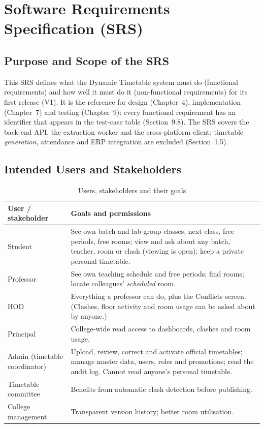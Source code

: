 \section{Software Requirements Specification (SRS)}

\subsection{Purpose and Scope of the SRS}
This SRS defines what the Dynamic Timetable system must do (functional requirements) and how well
it must do it (non-functional requirements) for its first release (V1). It is the reference for
design (Chapter~4), implementation (Chapter~7) and testing (Chapter~9): every functional requirement
has an identifier that appears in the test-case table (Section~9.8). The SRS covers the back-end
API, the extraction worker and the cross-platform client; timetable \emph{generation}, attendance and
ERP integration are excluded (Section~1.5).

\subsection{Intended Users and Stakeholders}
\begin{table}[H]
\centering
\caption{Users, stakeholders and their goals}
\label{tab:users}
\small
\begin{tabularx}{\textwidth}{@{}p{3cm}X@{}}
\toprule
\textbf{User / stakeholder} & \textbf{Goals and permissions}\\
\midrule
Student & See own batch and lab-group classes, next class, free periods, free rooms; view and ask about any batch, teacher, room or clash (viewing is open); keep a private personal timetable.\\
Professor & See own teaching schedule and free periods; find rooms; locate colleagues' \emph{scheduled} room.\\
HOD & Everything a professor can do, plus the Conflicts screen. (Clashes, floor activity and room usage can be asked about by anyone.)\\
Principal & College-wide read access to dashboards, clashes and room usage.\\
Admin (timetable coordinator) & Upload, review, correct and activate official timetables; manage master data, users, roles and promotions; read the audit log. Cannot read anyone's personal timetable.\\
Timetable committee & Benefits from automatic clash detection before publishing.\\
College management & Transparent version history; better room utilisation.\\
\bottomrule
\end{tabularx}
\end{table}

